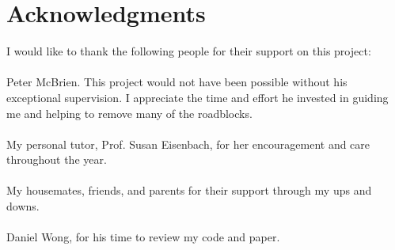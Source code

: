 \cleardoublepage
{}
{}
\chapter*{Acknowledgments}
\vspace{1.0in}
I would like to thank the following people for their support on this project:\\
\\
Peter McBrien. This project would not have been possible without his exceptional supervision. I appreciate the time and effort he invested in guiding me and helping to remove many of the roadblocks.\\
\\
My personal tutor, Prof. Susan Eisenbach, for her encouragement and care throughout the year.\\
\\
My housemates, friends, and parents for their support through my ups and downs. \\
\\
Daniel Wong, for his time to review my code and paper.\\
\\
\\
\\
\\
\\
\newpage
